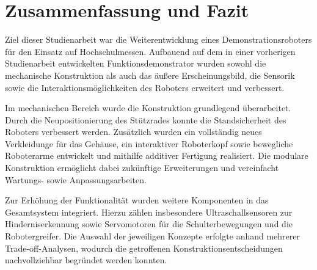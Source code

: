 \chapter{Zusammenfassung und Fazit}
\label{cha:Zusammenfassung}




%
%
%
%

Ziel dieser Studienarbeit war die Weiterentwicklung eines Demonstrationsroboters für den Einsatz auf Hochschulmessen. Aufbauend auf dem in einer vorherigen Studienarbeit entwickelten Funktionsdemonstrator wurden sowohl die mechanische Konstruktion als auch das äußere Erscheinungsbild, die Sensorik sowie die Interaktionsmöglichkeiten des Roboters erweitert und verbessert.

Im mechanischen Bereich wurde die Konstruktion grundlegend überarbeitet. Durch die Neupositionierung des Stützrades konnte die Standsicherheit des Roboters verbessert werden. Zusätzlich wurden ein vollständig neues Verkleidunge für das Gehäuse, ein interaktiver Roboterkopf sowie bewegliche Roboterarme entwickelt und mithilfe additiver Fertigung realisiert. Die modulare Konstruktion ermöglicht dabei zukünftige Erweiterungen und vereinfacht Wartungs- sowie Anpassungsarbeiten.

Zur Erhöhung der Funktionalität wurden weitere Komponenten in das Gesamtsystem integriert. Hierzu zählen insbesondere Ultraschallsensoren zur Hinderniserkennung sowie Servomotoren für die Schulterbewegungen und die Robotergreifer. Die Auswahl der jeweiligen Konzepte erfolgte anhand mehrerer Trade-off-Analysen, wodurch die getroffenen Konstruktionsentscheidungen nachvollziehbar begründet werden konnten.

